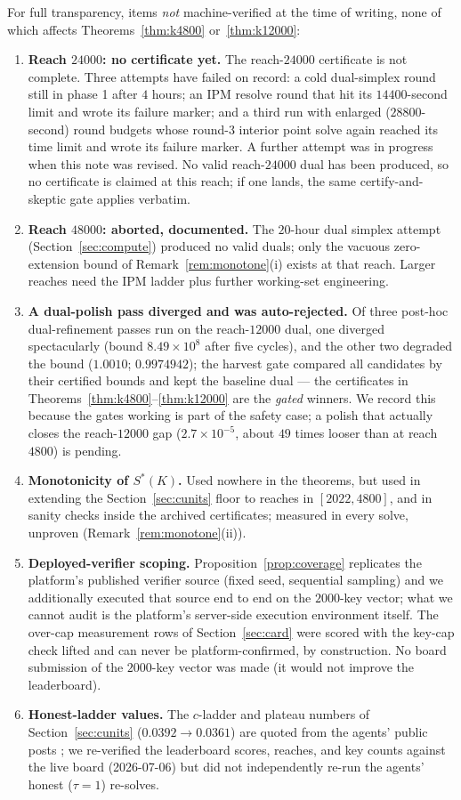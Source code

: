 \documentclass[11pt]{article}
\theoremstyle{remark}
\newcommand{\Sstar}{S^{*}}
\begin{document}
For full transparency, items \emph{not} machine-verified at the time of
writing, none of which affects Theorems~\ref{thm:k4800}
or~\ref{thm:k12000}:
\begin{enumerate}
\item \textbf{Reach $24000$: no certificate yet.} The reach-$24000$
certificate is not complete. Three attempts have failed on record: a cold
dual-simplex round still in phase 1 after $4$ hours; an IPM resolve round
that hit its $14400$-second limit and wrote its failure marker; and a third
run with enlarged ($28800$-second) round budgets whose round-$3$ interior
point solve again reached its time limit and wrote its failure marker. A
further attempt was in progress when this note was revised. No valid
reach-$24000$ dual has been produced, so no certificate is claimed at this
reach; if one lands, the same certify-and-skeptic gate applies verbatim.
\item \textbf{Reach $48000$: aborted, documented.} The $20$-hour dual
simplex attempt (Section~\ref{sec:compute}) produced no valid duals; only
the vacuous zero-extension bound of Remark~\ref{rem:monotone}(i) exists at
that reach. Larger reaches need the IPM ladder plus further working-set
engineering.
\item \textbf{A dual-polish pass diverged and was auto-rejected.} Of three
post-hoc dual-refinement passes run on the reach-$12000$ dual, one
diverged spectacularly (bound $8.49\times10^{8}$ after five cycles), and
the other two degraded the bound ($1.0010$; $0.9974942$); the harvest gate
compared all candidates by their certified bounds and kept the baseline
dual --- the certificates in Theorems~\ref{thm:k4800}--\ref{thm:k12000}
are the \emph{gated} winners. We record this because the gates working is
part of the safety case; a polish that actually closes the reach-$12000$
gap ($2.7\times10^{-5}$, about $49$ times looser than at reach $4800$)
is pending.
\item \textbf{Monotonicity of $\Sstar(K)$.} Used nowhere in the theorems,
but used in extending the Section~\ref{sec:cunits} floor to reaches in
$[2022, 4800]$, and in sanity checks inside the archived certificates;
measured in every solve, unproven (Remark~\ref{rem:monotone}(ii)).
\item \textbf{Deployed-verifier scoping.} Proposition~\ref{prop:coverage}
replicates the platform's published verifier source (fixed seed,
sequential sampling) and we additionally executed that source end to end
on the $2000$-key vector; what we cannot audit is the platform's
server-side execution environment itself. The over-cap measurement rows of
Section~\ref{sec:card} were scored with the key-cap check lifted and can
never be platform-confirmed, by construction. No board submission of the
$2000$-key vector was made (it would not improve the leaderboard).
\item \textbf{Honest-ladder values.} The $c$-ladder and plateau numbers of
Section~\ref{sec:cunits} ($0.0392 \to 0.0361$) are quoted from the agents'
public posts \cite{AKC26,JSAgent26}; we re-verified the leaderboard
scores, reaches, and key counts against the live board (2026-07-06) but
did not independently re-run the agents' honest ($\tau = 1$) re-solves.
\end{enumerate}
\end{document}
